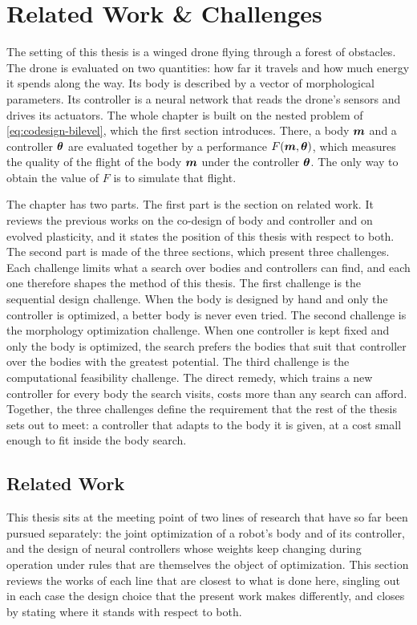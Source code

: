 \chapter{Related Work \& Challenges}
\label{ch:challenges}

The setting of this thesis is a winged drone flying through a forest of obstacles. The drone is evaluated on two quantities: how far it travels and how much energy it spends along the way. Its body is described by a vector of morphological parameters. Its controller is a neural network that reads the drone's sensors and drives its actuators. The whole chapter is built on the nested problem of \eqref{eq:codesign-bilevel}, which the first section introduces. There, a body $\bm{m}$ and a controller $\bm{\theta}$ are evaluated together by a performance $F(\bm{m}, \bm{\theta})$, which measures the quality of the flight of the body $\bm{m}$ under the controller $\bm{\theta}$. The only way to obtain the value of $F$ is to simulate that flight.

The chapter has two parts. The first part is the section on related work. It reviews the previous works on the co-design of body and controller and on evolved plasticity, and it states the position of this thesis with respect to both. The second part is made of the three sections, which present three challenges. Each challenge limits what a search over bodies and controllers can find, and each one therefore shapes the method of this thesis. The first challenge is the sequential design challenge. When the body is designed by hand and only the controller is optimized, a better body is never even tried. The second challenge is the morphology optimization challenge. When one controller is kept fixed and only the body is optimized, the search prefers the bodies that suit that controller over the bodies with the greatest potential. The third challenge is the computational feasibility challenge. The direct remedy, which trains a new controller for every body the search visits, costs more than any search can afford. Together, the three challenges define the requirement that the rest of the thesis sets out to meet: a controller that adapts to the body it is given, at a cost small enough to fit inside the body search.

\section{Related Work}
\label{sec:related-work}

This thesis sits at the meeting point of two lines of research that have so far been pursued separately: the joint optimization of a robot's body and of its controller, and the design of neural controllers whose weights keep changing during operation under rules that are themselves the object of optimization. This section reviews the works of each line that are closest to what is done here, singling out in each case the design choice that the present work makes differently, and closes by stating where it stands with respect to both.

